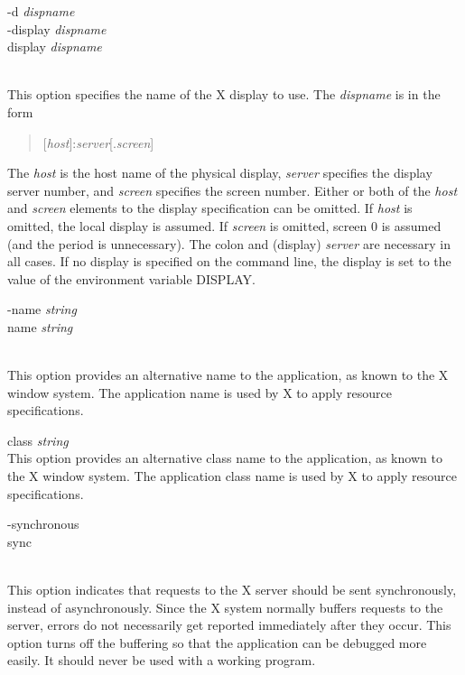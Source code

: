 \begin{description}
\item\parbox[b]{4in}{
{\et -d} {\it dispname}\\
{\et -display} {\it dispname}\\
{\et {}display} {\it dispname}}\\
This option specifies the name of the X display to use.  The {\it
dispname} is in the form
\begin{quote}
 [{\it host\/}]:{\it server\/}[.{\it screen\/}]\\
\end{quote}
The {\it host\/} is the host name of the
physical display, {\it server\/} specifies the display server number,
and {\it screen\/} specifies the screen number.  Either or both of the
{\it host\/} and {\it screen\/} elements to the display specification
can be omitted.  If {\it host\/} is omitted, the local display is
assumed.  If {\it screen\/} is omitted, screen 0 is assumed (and the
period is unnecessary).  The colon and (display) {\it server\/} are
necessary in all cases.  If no display is specified on the command
line, the display is set to the value of the environment variable {\et
DISPLAY}.

\item\parbox[b]{4in}{
{\et -name} {\it string}\\
{\et {}name} {\it string}}\\
This option provides an alternative name to the application, as known
to the X window system.  The application name is used by X to apply
resource specifications.

\item{\et {}class} {\it string}\\
This option provides an alternative class name to the application, as
known to the X window system.  The application class name is used by X
to apply resource specifications.

\item\parbox[b]{4in}{
{\et -synchronous}\\
{\et {}sync}}\\
This option indicates that requests to the X server should be sent
synchronously, instead of asynchronously.  Since the X system normally
buffers requests to the server, errors do not necessarily get reported
immediately after they occur.  This option turns off the buffering so
that the application can be debugged more easily.  It should never be
used with a working program.


\end{description}
